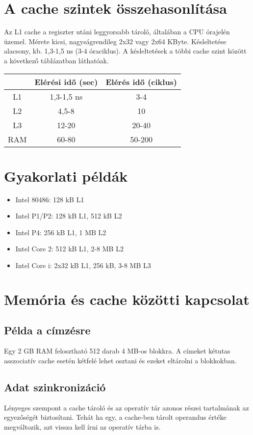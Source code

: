 \section{A cache szintek összehasonlítása}
Az L1 cache a regiszter utáni leggyorsabb tároló, általában a CPU órajelén üzemel.
Mérete kicsi, nagyságrendileg 2x32 vagy 2x64 KByte.
Késleltetése alacsony, kb. 1,3-1,5 ns (3-4 óraciklus).
A késleltetések a többi cache szint között a következő táblázatban láthatóak.
\begin{center}
    \begin{tabular}{c | c | c}
        & Elérési idő (sec) & Elérés idő (ciklus) \\
        \hline
        L1 & 1,3-1,5 ns & 3-4 \\
        \hline
        L2 & 4,5-8 & 10 \\
        \hline
        L3 & 12-20 & 20-40 \\
        \hline
        RAM & 60-80 & 50-200 \\
    \end{tabular}
\end{center}

\section{Gyakorlati példák}
\begin{itemize}
    \item Intel 80486: 128 kB L1
    \item Intel P1/P2: 128 kB L1, 512 kB L2
    \item Intel P4: 256 kB L1, 1 MB L2
    \item Intel Core 2: 512 kB L1, 2-8 MB L2
    \item Intel Core i: 2x32 kB L1, 256 kB, 3-8 MB L3
\end{itemize}

\section{Memória és cache közötti kapcsolat}

\subsection{Példa a címzésre}
Egy 2 GB RAM felosztható 512 darab 4 MB-os blokkra.
A címeket kétutas asszociatív cache esetén kétfelé lehet osztani és ezeket eltárolni a blokkokban.

\subsection{Adat szinkronizáció}
Lényeges szempont a cache tároló és az operatív tár azonos részei tartalmának az egyezőségét biztosítani.
Tehát ha egy, a cache-ben tárolt operandus értéke megváltozik, azt vissza kell írni az operatív tárba is.

